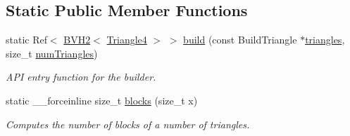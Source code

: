 \subsection*{Static Public Member Functions}
\begin{DoxyCompactItemize}
\item 
\hypertarget{classembree_1_1_b_v_h2_builder_a09dc2d9731d50b82d2613be6c23234c0}{
static Ref$<$ \hyperlink{classembree_1_1_b_v_h2}{BVH2}$<$ \hyperlink{structembree_1_1_triangle4}{Triangle4} $>$ $>$ \hyperlink{classembree_1_1_b_v_h2_builder_a09dc2d9731d50b82d2613be6c23234c0}{build} (const BuildTriangle $\ast$\hyperlink{classembree_1_1_b_v_h2_builder_afd3fecbcf0fdc61b11eedd12c4f4f590}{triangles}, size\_\-t \hyperlink{classembree_1_1_b_v_h2_builder_a2abbd7a4aaa44e93f4eadbcff1eb9ac3}{numTriangles})}
\label{classembree_1_1_b_v_h2_builder_a09dc2d9731d50b82d2613be6c23234c0}

\begin{DoxyCompactList}\small\item\em API entry function for the builder. \item\end{DoxyCompactList}\item 
static \_\-\_\-forceinline size\_\-t \hyperlink{classembree_1_1_b_v_h2_builder_a5c112c6ec6f0056dddad4393bd8adaa5}{blocks} (size\_\-t x)
\begin{DoxyCompactList}\small\item\em Computes the number of blocks of a number of triangles. \item\end{DoxyCompactList}\end{DoxyCompactItemize}
